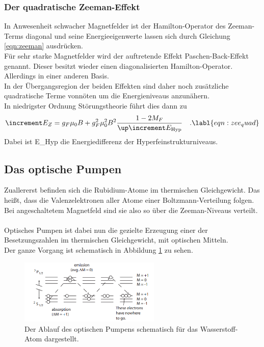 \subsubsection{Der quadratische Zeeman-Effekt}

\noindent
In Anwesenheit schwacher Magnetfelder ist der Hamilton-Operator des Zeeman-Terms diagonal und seine Energieeigenwerte lassen sich durch Gleichung \ref{eqn:zeeman} ausdrücken.\\
Für sehr starke Magnetfelder wird der auftretende Effekt Paschen-Back-Effekt genannt. Dieser besitzt wieder einen diagonalisierten Hamilton-Operator. Allerdings in einer anderen Basis.\\
In der Übergangsregion der beiden Effekten sind daher noch zusätzliche quadratische Terme vonnöten um die Energieniveaus anzunähern.\\ 
In niedrigster Ordnung Störungstheorie führt dies dann zu
\begin{equation*}
 \increment E_{Z} = g_F\mu_\text{0}B+g^2_F\mu^2_\text{0}B^2\frac{1-2M_F}{\up\increment E_\text{Hyp}} \quad . 
 \labl{eqn:zee_quad}
\end{equation*} 
Dabei ist E_{Hyp} die Energiedifferenz der Hyperfeinstrukturniveaus.

\subsection{Das optische Pumpen}

\noindent
Zuallererst befinden sich die Rubidium-Atome im thermischen Gleichgewicht. 
Das heißt, dass die Valenzelektronen aller Atome einer Boltzmann-Verteilung folgen. 
Bei angeschaltetem Magnetfeld sind sie also so über die Zeeman-Niveaus verteilt.\\\\
Optisches Pumpen ist dabei nun die gezielte Erzeugung einer der Besetzungszahlen im thermischen Gleichgewicht, mit optischen Mitteln.\\
Der ganze Vorgang ist schematisch in Abbildung \ref{img:pumpitup} zu sehen.

\begin{figure}[H]
    \centering
    \includegraphics[width=0.6\textwidth]{latex/images/pumping.PNG}
    \caption{Der Ablauf des optischen Pumpens schematisch für das Wasserstoff-Atom dargestellt\protect \cite{pump_1}.}
    \label{img:pumpitup}
\end{figure}


